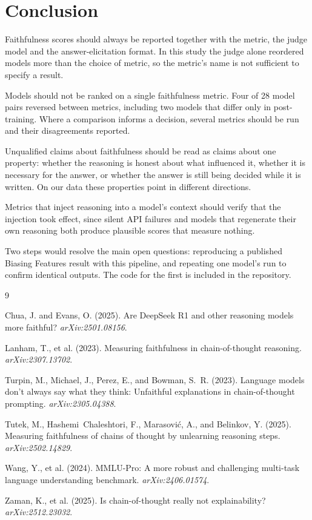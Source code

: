 \documentclass[11pt]{article}
\begin{document}
\section{Conclusion}

Faithfulness scores should always be reported together with the metric, the judge model and the
answer-elicitation format. In this study the judge alone reordered models more than the choice
of metric, so the metric's name is not sufficient to specify a result.

Models should not be ranked on a single faithfulness metric. Four of 28 model pairs reversed
between metrics, including two models that differ only in post-training. Where a comparison
informs a decision, several metrics should be run and their disagreements reported.

Unqualified claims about faithfulness should be read as claims about one property: whether the
reasoning is honest about what influenced it, whether it is necessary for the answer, or
whether the answer is still being decided while it is written. On our data these properties
point in different directions.

Metrics that inject reasoning into a model's context should verify that the injection took
effect, since silent API failures and models that regenerate their own reasoning both produce
plausible scores that measure nothing.

Two steps would resolve the main open questions: reproducing a published Biasing Features
result with this pipeline, and repeating one model's run to confirm identical outputs. The code
for the first is included in the repository.

\begin{thebibliography}{9}
\setlength{\itemsep}{2pt}

Chua, J. and Evans, O. (2025).
Are DeepSeek R1 and other reasoning models more faithful?
\emph{arXiv:2501.08156}.

Lanham, T., et al. (2023).
Measuring faithfulness in chain-of-thought reasoning.
\emph{arXiv:2307.13702}.

Turpin, M., Michael, J., Perez, E., and Bowman, S.~R. (2023).
Language models don't always say what they think: Unfaithful explanations in chain-of-thought
prompting.
\emph{arXiv:2305.04388}.

Tutek, M., Hashemi~Chaleshtori, F., Marasovi\'{c}, A., and Belinkov, Y. (2025).
Measuring faithfulness of chains of thought by unlearning reasoning steps.
\emph{arXiv:2502.14829}.

Wang, Y., et al. (2024).
MMLU-Pro: A more robust and challenging multi-task language understanding benchmark.
\emph{arXiv:2406.01574}.

Zaman, K., et al. (2025).
Is chain-of-thought really not explainability?
\emph{arXiv:2512.23032}.

\end{thebibliography}
\end{document}
